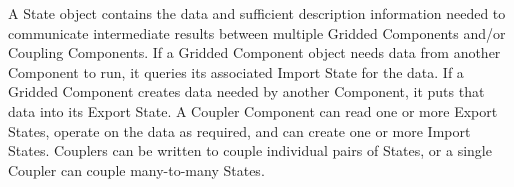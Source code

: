 %


A State object contains the data and sufficient
description information needed to communicate intermediate results
between multiple Gridded Components and/or Coupling Components.
If a Gridded Component object needs data
from another Component to run, it queries its associated
Import State for the data.  If a Gridded Component creates data
needed by another Component, it puts that data into its
Export State.  A Coupler Component can read one or more Export States,
operate on the data as required, and can create one or more Import States.
Couplers can be written to couple individual pairs of States, or
a single Coupler can couple many-to-many States.

 




